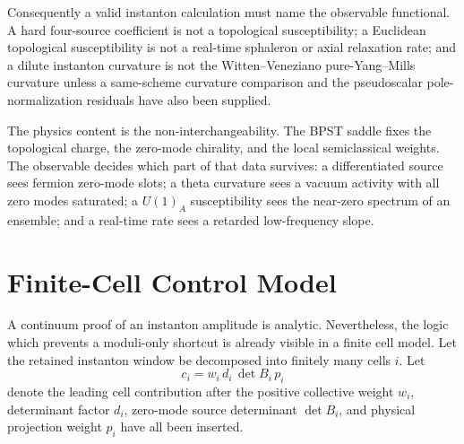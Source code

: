 \begin{remark}
Consequently a valid instanton calculation must name the observable functional.
A hard four-source coefficient is not a topological susceptibility; a
Euclidean topological susceptibility is not a real-time sphaleron or axial
relaxation rate; and a dilute instanton curvature is not the
Witten--Veneziano pure-Yang--Mills curvature unless a same-scheme curvature
comparison and the pseudoscalar pole-normalization residuals have also been
supplied.
\end{remark}

The physics content is the non-interchangeability.  The BPST saddle fixes the
topological charge, the zero-mode chirality, and the local semiclassical
weights.  The observable decides which part of that data survives: a
differentiated source sees fermion zero-mode slots; a theta curvature sees a
vacuum activity with all zero modes saturated; a \(U(1)_A\) susceptibility sees
the near-zero spectrum of an ensemble; and a real-time rate sees a retarded
low-frequency slope.

\section{Finite-Cell Control Model}
\label{sec:finite-cell-instanton-channel-control}

A continuum proof of an instanton amplitude is analytic.  Nevertheless, the
logic which prevents a moduli-only shortcut is already visible in a finite
cell model.  Let the retained instanton window be decomposed into finitely
many cells \(i\).  Let
\[
  c_i
  =
  w_i\,d_i\,\det B_i\,p_i
\]
denote the leading cell contribution after the positive collective weight
\(w_i\), determinant factor \(d_i\), zero-mode source determinant
\(\det B_i\), and physical projection weight \(p_i\) have all been inserted.


